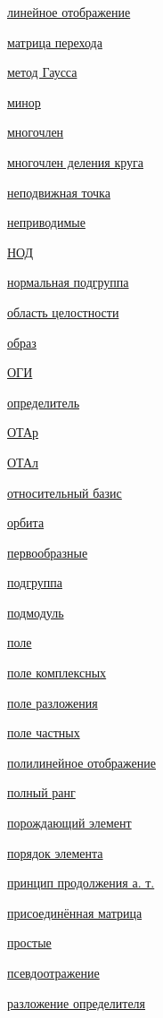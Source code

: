 \documentclass[a4paper,100pt]{article}
\theoremstyle{indented}
\theoremstyle{definition}
\theoremstyle{remark}
\begin{document}
\begin{multicols}{2}
    \hyperlink{n48}{линейное отображение}\

    \hyperlink{n55}{матрица перехода}\

    \hyperlink{n60}{метод Гаусса}\

    \hyperlink{n99}{минор}\

    \hyperlink{n27}{многочлен}\

    \hyperlink{n93}{многочлен деления круга}\

    \hyperlink{n72}{неподвижная точка}\

    \hyperlink{n7}{неприводимые}\

    \hyperlink{n6}{НОД}\

    \hyperlink{n87}{нормальная подгруппа}\

    \hyperlink{n2}{область целостности}\

    \hyperlink{n21}{образ}\

    \hyperlink{n10}{ОГИ}\

    \hyperlink{n95}{определитель}\

    \hyperlink{n13}{ОТАр}\

    \hyperlink{n40}{ОТАл}\

    \hyperlink{n52}{относительный базис}\

    \hyperlink{n82}{орбита}\

    \hyperlink{n92}{первообразные}\

    \hyperlink{n67}{подгруппа}\

    \hyperlink{n49}{подмодуль}\

    \hyperlink{n16}{поле}\

    \hyperlink{n38}{поле комплексных}\

    \hyperlink{n37}{поле разложения}\

    \hyperlink{n18}{поле частных}\

    \hyperlink{n95}{полилинейное отображение}\

    \hyperlink{n56}{полный ранг}\

    \hyperlink{n71}{порождающий элемент}\

    \hyperlink{n69}{порядок элемента}\

    \hyperlink{n104}{принцип продолжения а. т.}\

    \hyperlink{n101}{присоединённая матрица}\

    \hyperlink{n8}{простые}\ 

    \hyperlink{n58}{псевдоотражение}\

    \hyperlink{n100}{разложение определителя}\


\end{multicols}
\end{document}
